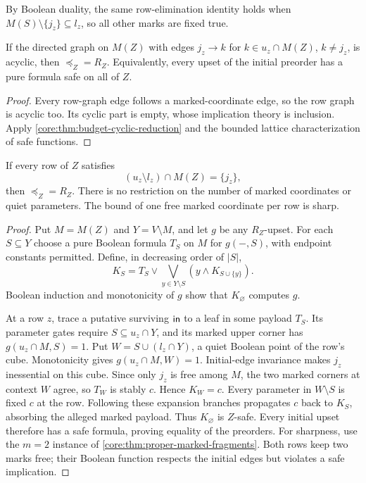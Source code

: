 By Boolean duality, the same row-elimination identity holds when
$M(S)\setminus\{j_z\}\subseteq l_z$, so all other marks are fixed true.

\begin{theorem}
\label{core:thm:acyclic-marked-budgets}
If the directed graph on $M(Z)$ with edges $j_z\to k$ for
$k\in u_z\cap M(Z)$, $k\ne j_z$, is acyclic, then
$\preceq_Z=R_Z$. Equivalently, every upset of the initial preorder has a
pure formula safe on all of $Z$.
\end{theorem}
\begin{proof}
Every row-graph edge follows a marked-coordinate edge, so the row graph
is acyclic too. Its cyclic part is empty, whose implication theory is
inclusion. Apply \cref{core:thm:budget-cyclic-reduction} and the bounded
lattice characterization of safe functions.
\end{proof}

\begin{theorem}
\label{core:thm:one-free-mark-budgets}
If every row of $Z$ satisfies
\[
 (u_z\setminus l_z)\cap M(Z)=\{j_z\},
\]
then $\preceq_Z=R_Z$. There is no restriction on the number of marked
coordinates or quiet parameters. The bound of one free marked coordinate
per row is sharp.
\end{theorem}
\begin{proof}
Put $M=M(Z)$ and $Y=V\setminus M$, and let $g$ be any $R_Z$-upset.
For each $S\subseteq Y$ choose a pure Boolean formula $T_S$ on $M$
for $g(-,S)$, with endpoint constants permitted. Define, in decreasing
order of $|S|$,
\[
 K_S=T_S\vee\bigvee_{y\in Y\setminus S}
                   (y\wedge K_{S\cup\{y\}}).
\]
Boolean induction and monotonicity of $g$ show that $K_\varnothing$
computes $g$.

At a row $z$, trace a putative surviving $\mathsf{in}$ to a leaf in some
payload $T_S$. Its parameter gates require $S\subseteq u_z\cap Y$,
and its marked upper corner has $g(u_z\cap M,S)=1$.
Put $W=S\cup(l_z\cap Y)$, a quiet Boolean point of the row's cube.
Monotonicity gives $g(u_z\cap M,W)=1$. Initial-edge invariance makes
$j_z$ inessential on this cube. Since only $j_z$ is free among $M$,
the two marked corners at context $W$ agree, so $T_W$ is stably $c$.
Hence $K_W=c$. Every parameter in $W\setminus S$ is fixed $c$ at the
row. Following these expansion branches propagates $c$ back to $K_S$,
absorbing the alleged marked payload. Thus $K_\varnothing$ is $Z$-safe.
Every initial upset therefore has a safe formula, proving equality of
the preorders. For sharpness, use the $m=2$ instance of
\cref{core:thm:proper-marked-fragments}. Both rows keep two marks free;
their Boolean function respects the initial edges but violates a safe
implication.
\end{proof}


